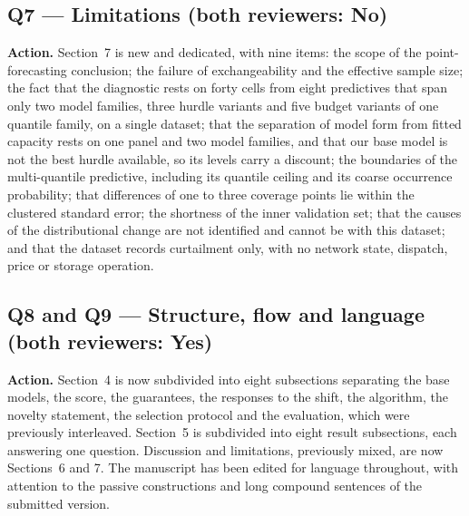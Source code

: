 \documentclass[11pt,a4paper]{article}
\newcommand{\action}[1]{\textbf{Action.} #1}
\begin{document}
\subsection*{Q7 --- Limitations (both reviewers: No)}

\action{Section~7 is new and dedicated, with nine items: the scope of the point-forecasting conclusion; the failure of exchangeability and the effective sample size; the fact that the diagnostic rests on forty cells from eight predictives that span only two model families, three hurdle variants and five budget variants of one quantile family, on a single dataset; that the separation of model form from fitted capacity rests on one panel and two model families, and that our base model is not the best hurdle available, so its levels carry a discount; the boundaries of the multi-quantile predictive, including its quantile ceiling and its coarse occurrence probability; that differences of one to three coverage points lie within the clustered standard error; the shortness of the inner validation set; that the causes of the distributional change are not identified and cannot be with this dataset; and that the dataset records curtailment only, with no network state, dispatch, price or storage operation.}

\subsection*{Q8 and Q9 --- Structure, flow and language (both reviewers: Yes)}

\action{Section~4 is now subdivided into eight subsections separating the base models, the score, the guarantees, the responses to the shift, the algorithm, the novelty statement, the selection protocol and the evaluation, which were previously interleaved. Section~5 is subdivided into eight result subsections, each answering one question. Discussion and limitations, previously mixed, are now Sections~6 and 7. The manuscript has been edited for language throughout, with attention to the passive constructions and long compound sentences of the submitted version.}
\end{document}
